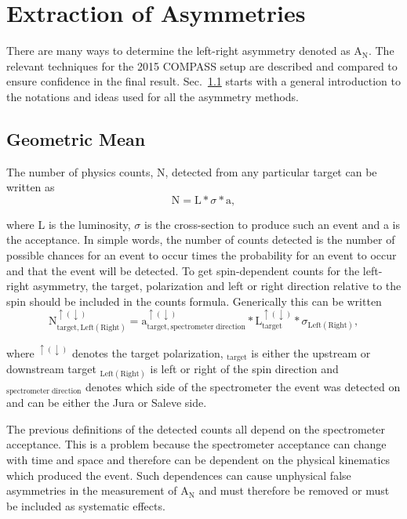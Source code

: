 \section{Extraction of Asymmetries} 
There are many ways to determine the left-right asymmetry denoted as
A$_{\mathrm{N}}$.  The relevant techniques for the 2015 COMPASS setup are
described and compared to ensure confidence in the final result.
Sec.~\ref{sec::GeoMean} starts with a general introduction to the notations and
ideas used for all the asymmetry methods.

\subsection{Geometric Mean} \label{sec::GeoMean}
The number of physics counts, N, detected from any particular target can be
written as
\begin{equation}
  \mathrm{N} = \mathrm{L} * \sigma * \mathrm{a},
\end{equation}

\noindent
where L is the luminosity, $\sigma$ is the cross-section to produce such an
event and a is the acceptance.  In simple words, the number of counts detected
is the number of possible chances for an event to occur times the probability
for an event to occur and that the event will be detected.  To get
spin-dependent counts for the left-right asymmetry, the target, polarization
and left or right direction relative to the spin should be included in the
counts formula.  Generically this can be written
\begin{equation}
  \label{eqn::indexedCount}
  \mathrm{N}^{\uparrow(\downarrow)}_{\mathrm{target},\mathrm{Left(Right)}} =
  \mathrm{a}^{\uparrow(\downarrow)}_{\mathrm{target},\mathrm{spectrometer \;
      direction}} * \mathrm{L}^{\uparrow(\downarrow)}_{\mathrm{target}} *
  \sigma_{\mathrm{Left(Right)}},
\end{equation}

\noindent
where $^{\uparrow(\downarrow)}$ denotes the target polarization,
$_{\mathrm{target}}$ is either the upstream or downstream target
$_{\mathrm{Left(Right)}}$ is left or right of the spin direction and
${_\mathrm{spectrometer \; direction}}$ denotes which side of the spectrometer
the event was detected on and can be either the Jura or Saleve side.

The previous definitions of the detected counts all depend on the spectrometer
acceptance.  This is a problem because the spectrometer acceptance can change
with time and space and therefore can be dependent on the physical kinematics
which produced the event.  Such dependences can cause unphysical false
asymmetries in the measurement of A$_{\mathrm{N}}$ and must therefore be removed
or must be included as systematic effects.

